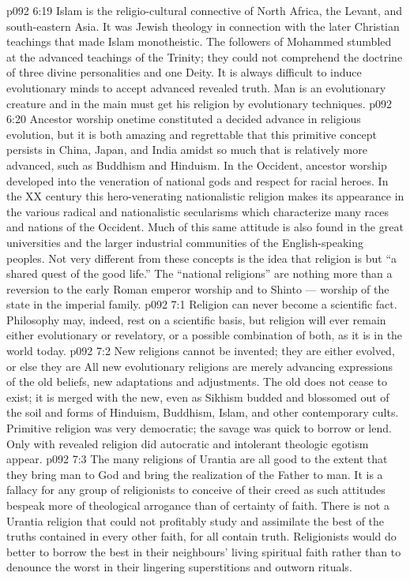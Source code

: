 \vs p092 6:19 Islam is the religio\hyp{}cultural connective of North Africa, the Levant, and south\hyp{}eastern Asia. It was Jewish theology in connection with the later Christian teachings that made Islam monotheistic. The followers of Mohammed stumbled at the advanced teachings of the Trinity; they could not comprehend the doctrine of three divine personalities and one Deity. It is always difficult to induce evolutionary minds  to accept advanced revealed truth. Man is an evolutionary creature and in the main must get his religion by evolutionary techniques.
\vs p092 6:20 \pc Ancestor worship onetime constituted a decided advance in religious evolution, but it is both amazing and regrettable that this primitive concept persists in China, Japan, and India amidst so much that is relatively more advanced, such as Buddhism and Hinduism. In the Occident, ancestor worship developed into the veneration of national gods and respect for racial heroes. In the XX century this hero\hyp{}venerating nationalistic religion makes its appearance in the various radical and nationalistic secularisms which characterize many races and nations of the Occident. Much of this same attitude is also found in the great universities and the larger industrial communities of the English\hyp{}speaking peoples. Not very different from these concepts is the idea that religion is but “a shared quest of the good life.” The “national religions” are nothing more than a reversion to the early Roman emperor worship and to Shinto --- worship of the state in the imperial family.
\vs p092 7:1 Religion can never become a scientific fact. Philosophy may, indeed, rest on a scientific basis, but religion will ever remain either evolutionary or revelatory, or a possible combination of both, as it is in the world today.
\vs p092 7:2 New religions cannot be invented; they are either evolved, or else they are  All new evolutionary religions are merely advancing expressions of the old beliefs, new adaptations and adjustments. The old does not cease to exist; it is merged with the new, even as Sikhism budded and blossomed out of the soil and forms of Hinduism, Buddhism, Islam, and other contemporary cults. Primitive religion was very democratic; the savage was quick to borrow or lend. Only with revealed religion did autocratic and intolerant theologic egotism appear.
\vs p092 7:3 The many religions of Urantia are all good to the extent that they bring man to God and bring the realization of the Father to man. It is a fallacy for any group of religionists to conceive of their creed as  such attitudes bespeak more of theological arrogance than of certainty of faith. There is not a Urantia religion that could not profitably study and assimilate the best of the truths contained in every other faith, for all contain truth. Religionists would do better to borrow the best in their neighbours’ living spiritual faith rather than to denounce the worst in their lingering superstitions and outworn rituals.
